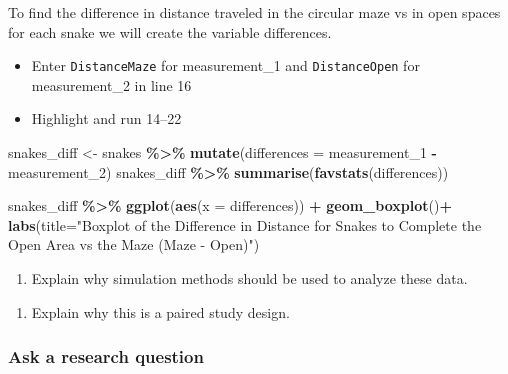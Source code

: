 \documentclass[
]{report}
\newenvironment{Shaded}{\begin{snugshade}}{\end{snugshade}}
\newcommand{\AttributeTok}[1]{\textcolor[rgb]{0.13,0.29,0.53}{#1}}
\newcommand{\FunctionTok}[1]{\textcolor[rgb]{0.13,0.29,0.53}{\textbf{#1}}}
\newcommand{\NormalTok}[1]{#1}
\newcommand{\OtherTok}[1]{\textcolor[rgb]{0.56,0.35,0.01}{#1}}
\newcommand{\SpecialCharTok}[1]{\textcolor[rgb]{0.81,0.36,0.00}{\textbf{#1}}}
\newcommand{\StringTok}[1]{\textcolor[rgb]{0.31,0.60,0.02}{#1}}
\providecommand{\tightlist}{%
  \setlength{\itemsep}{0pt}\setlength{\parskip}{0pt}}
\begin{document}
To find the difference in distance traveled in the circular maze vs in open spaces for each snake we will create the variable differences.

\begin{itemize}
\item
  Enter \texttt{DistanceMaze} for measurement\_1 and \texttt{DistanceOpen} for measurement\_2 in line 16
\item
  Highlight and run 14--22
\end{itemize}

\begin{Shaded}
\begin{Highlighting}[]
\NormalTok{snakes\_diff }\OtherTok{\textless{}{-}}\NormalTok{ snakes }\SpecialCharTok{\%\textgreater{}\%} 
  \FunctionTok{mutate}\NormalTok{(}\AttributeTok{differences =}\NormalTok{ measurement\_1 }\SpecialCharTok{{-}}\NormalTok{ measurement\_2)}
\NormalTok{snakes\_diff }\SpecialCharTok{\%\textgreater{}\%} 
    \FunctionTok{summarise}\NormalTok{(}\FunctionTok{favstats}\NormalTok{(differences))}

\NormalTok{snakes\_diff }\SpecialCharTok{\%\textgreater{}\%} 
    \FunctionTok{ggplot}\NormalTok{(}\FunctionTok{aes}\NormalTok{(}\AttributeTok{x =}\NormalTok{ differences)) }\SpecialCharTok{+}
    \FunctionTok{geom\_boxplot}\NormalTok{()}\SpecialCharTok{+}
    \FunctionTok{labs}\NormalTok{(}\AttributeTok{title=}\StringTok{"Boxplot of the Difference in Distance for Snakes to }
\StringTok{         Complete the Open Area vs the Maze }
\StringTok{         (Maze {-} Open)"}\NormalTok{)}
\end{Highlighting}
\end{Shaded}

\begin{enumerate}
\def\labelenumi{\arabic{enumi}.}
\tightlist
\item
  Explain why simulation methods should be used to analyze these data.
\end{enumerate}

\vspace{0.6in}

\begin{enumerate}
\def\labelenumi{\arabic{enumi}.}
\setcounter{enumi}{1}
\tightlist
\item
  Explain why this is a paired study design.
\end{enumerate}

\vspace{0.6in}

\subsubsection*{Ask a research question}\label{ask-a-research-question-4}
\end{document}
